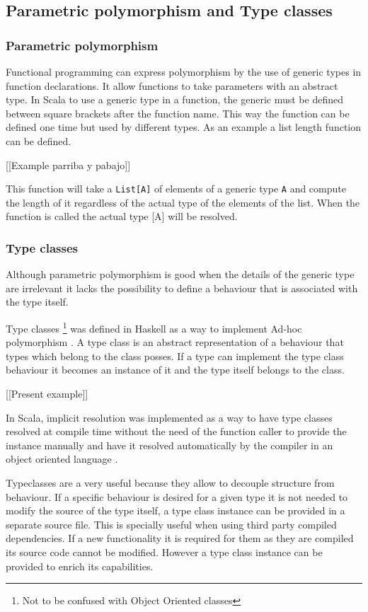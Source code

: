 \documentclass[../main.tex]{subfiles}
\begin{document}
\subsection{Parametric polymorphism and Type classes}
\subsubsection{Parametric polymorphism} Functional programming can express
polymorphism by the use of generic types in function declarations. It allow
functions to take parameters with an abstract type. In Scala to use a generic
type in a function, the generic must be defined between square brackets after
the function name. This way the function can be defined one time but used by
different types. As an example a list length function can be defined.

[[Example parriba y pabajo]]

This function will take a \texttt{List[A]} of elements of a generic type
\texttt{A} and compute the length of it regardless of the actual type of the
elements of the list. When the function is called the actual type [A] will be
resolved.

\subsubsection{Type classes} Although parametric polymorphism is good when the
details of the generic type are irrelevant it lacks the possibility to define a
behaviour that is associated with the type itself.

Type classes \footnote{Not to be confused with Object Oriented classes} was
defined in Haskell as a way to implement Ad-hoc polymorphism
\autocite{Hall1994TypeHaskell}. A type class is an abstract representation of a
behaviour that types which belong to the class posses. If a type can implement
the type class behaviour it becomes an instance of it and the type itself
belongs to the class.

[[Present example]]

In Scala, implicit resolution was implemented as a way to have type classes
resolved at compile time without the need of the function caller to provide the
instance manually and have it resolved automatically by the compiler in an
object oriented language \autocite{Oliveira2010TypeImplicits}.

Typeclasses are a very useful because they allow to decouple structure from
behaviour. If a specific behaviour is desired for a given type it is not needed
to modify the source of the type itself, a type class instance can be provided
in a separate source file. This is specially useful when using third party
compiled dependencies. If a new functionality it is required for them as they
are compiled its source code cannot be modified. However a type class instance
can be provided to enrich its capabilities.
\end{document}
